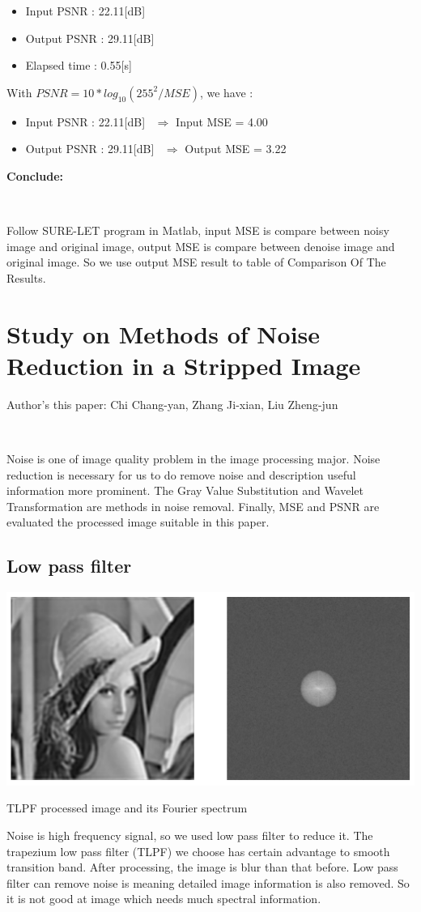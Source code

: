 \begin{itemize}
	\item Input PSNR   : 22.11[dB] 
	\item Output PSNR  : 29.11[dB]
	\item Elapsed time : 0.55[s]
\end{itemize}

With \textbf{$PSNR = 10*log_{10}(255^2/MSE)$}, we have :
\begin{itemize}
	\item Input PSNR   : 22.11[dB] \ $\Rightarrow$ Input MSE = 4.00
	\item Output PSNR  : 29.11[dB] \ $\Rightarrow$ Output MSE = 3.22
\end{itemize}
\textbf{Conclude:}

\

Follow SURE-LET program in Matlab, input MSE is compare between noisy image and original image, output MSE is compare between denoise image and original image. So we use output MSE result to table of Comparison Of The Results.

\section{Study on Methods of Noise Reduction in a Stripped Image}

Author's this paper: Chi Chang-yan, Zhang Ji-xian, Liu Zheng-jun

\

Noise is one of  image quality problem in the image processing major. Noise reduction is necessary for us to do remove noise and description useful information more prominent. The Gray Value Substitution and Wavelet Transformation are methods in noise removal. Finally, MSE and PSNR are evaluated the processed image suitable in this paper.


\subsection{Low pass filter}
\begin{center}
\includegraphics{lowpass.png}


TLPF processed image and its Fourier spectrum 
\end{center}
Noise is high frequency signal, so we used  low pass filter to reduce it. The trapezium low pass filter (TLPF) we choose has certain advantage to smooth transition band. After processing, the image is blur than that before. Low pass filter can remove noise is meaning detailed image information is also removed. So it is not good at image which needs much spectral information. 

